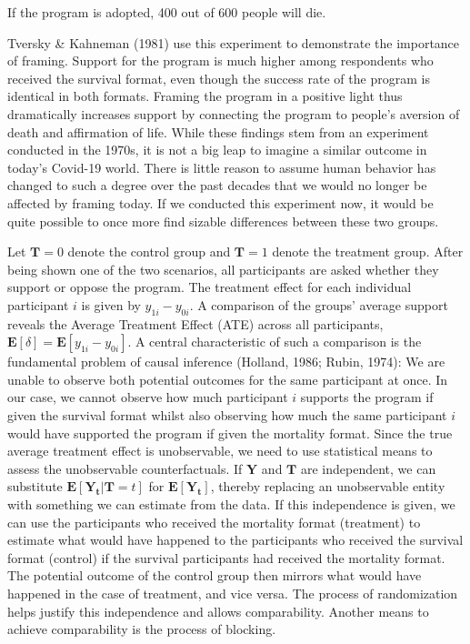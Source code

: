 \documentclass[12pt,econ]{sources/authesis}
\begin{document}
\vspace{0.3cm}
\begin{adjustwidth}{50pt}{50pt}
\ssp
\noindent If the program is adopted, 400 out of 600 people will die.
\end{adjustwidth}
Tversky \& Kahneman (1981) use this experiment to demonstrate the importance of framing. Support for the program is much higher among respondents who received the survival format, even though the success rate of the program is identical in both formats. Framing the program in a positive light thus dramatically increases support by connecting the program to people's aversion of death and affirmation of life. While these findings stem from an experiment conducted in the 1970s, it is not a big leap to imagine a similar outcome in today's Covid-19 world. There is little reason to assume human behavior has changed to such a degree over the past decades that we would no longer be affected by framing today. If we conducted this experiment now, it would be quite possible to once more find sizable differences between these two groups.

Let \(\bm{T}=0\) denote the control group and \(\bm{T}=1\) denote the treatment group. After being shown one of the two scenarios, all participants are asked whether they support or oppose the program. The treatment effect for each individual participant \(i\) is given by \(y_{1i} - y_{0i}\). A comparison of the groups' average support reveals the Average Treatment Effect (ATE) across all participants, \(\mathbf{E}[\delta] = \mathbf{E}[y_{1i} - y_{0i}]\). A central characteristic of such a comparison is the fundamental problem of causal inference (Holland, 1986; Rubin, 1974): We are unable to observe both potential outcomes for the same participant at once. In our case, we cannot observe how much participant \(i\) supports the program if given the survival format whilst also observing how much the same participant \(i\) would have supported the program if given the mortality format. Since the true average treatment effect is unobservable, we need to use statistical means to assess the unobservable counterfactuals. If \(\bm{Y}\) and \(\bm{T}\) are independent, we can substitute \(\mathbf{E}[\bm{Y_t}|\bm{T}=t]\) for \(\mathbf{E}[\bm{Y_t}]\), thereby replacing an unobservable entity with something we can estimate from the data. If this independence is given, we can use the participants who received the mortality format (treatment) to estimate what would have happened to the participants who received the survival format (control) if the survival participants had received the mortality format. The potential outcome of the control group then mirrors what would have happened in the case of treatment, and vice versa. The process of randomization helps justify this independence and allows comparability. Another means to achieve comparability is the process of blocking.
\end{document}
